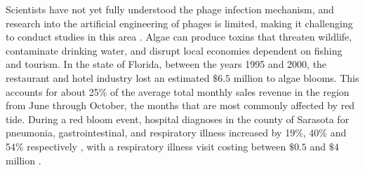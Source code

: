 Scientists have not yet fully understood the phage infection mechanism, and research into the artificial engineering of phages is limited, making it challenging to conduct studies in this area \cite{grassoReviewCyanophageHost2022, DissolvedMicrocystinRelease}.\newline 
Algae can produce toxins that threaten wildlife, contaminate drinking water, and disrupt local economies dependent on fishing and tourism.
In the state of Florida, between the years 1995 and 2000, the restaurant and hotel industry lost an estimated $\$6.5$ million to algae blooms.
This accounts for about 25\% of the average total monthly sales revenue in the region from June through October, the months that are most commonly affected by red tide\cite{PDFEconomicImpacts}.
During a red bloom event, hospital diagnoses in the county of Sarasota for pneumonia, gastrointestinal, and respiratory illness increased by 19\%, 40\% and 54\% respectively \cite{chengCharacterizationMarineAerosol2005, kirkpatrickGastrointestinalEmergencyRoom2010}, with a respiratory illness visit costing between $\$0.5$ and $\$4$ million \cite{hoaglandCostsRespiratoryIllnesses2009}. 